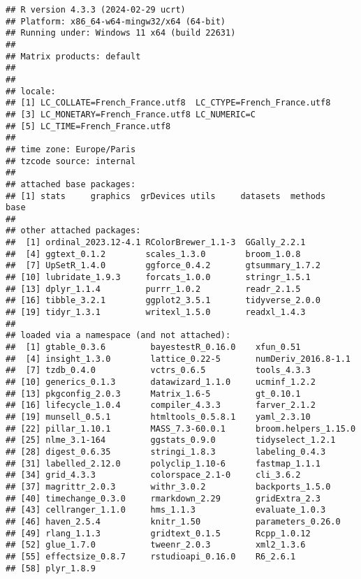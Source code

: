 \documentclass[
]{article}
\begin{document}
\begin{verbatim}
## R version 4.3.3 (2024-02-29 ucrt)
## Platform: x86_64-w64-mingw32/x64 (64-bit)
## Running under: Windows 11 x64 (build 22631)
## 
## Matrix products: default
## 
## 
## locale:
## [1] LC_COLLATE=French_France.utf8  LC_CTYPE=French_France.utf8   
## [3] LC_MONETARY=French_France.utf8 LC_NUMERIC=C                  
## [5] LC_TIME=French_France.utf8    
## 
## time zone: Europe/Paris
## tzcode source: internal
## 
## attached base packages:
## [1] stats     graphics  grDevices utils     datasets  methods   base     
## 
## other attached packages:
##  [1] ordinal_2023.12-4.1 RColorBrewer_1.1-3  GGally_2.2.1       
##  [4] ggtext_0.1.2        scales_1.3.0        broom_1.0.8        
##  [7] UpSetR_1.4.0        ggforce_0.4.2       gtsummary_1.7.2    
## [10] lubridate_1.9.3     forcats_1.0.0       stringr_1.5.1      
## [13] dplyr_1.1.4         purrr_1.0.2         readr_2.1.5        
## [16] tibble_3.2.1        ggplot2_3.5.1       tidyverse_2.0.0    
## [19] tidyr_1.3.1         writexl_1.5.0       readxl_1.4.3       
## 
## loaded via a namespace (and not attached):
##  [1] gtable_0.3.6         bayestestR_0.16.0    xfun_0.51           
##  [4] insight_1.3.0        lattice_0.22-5       numDeriv_2016.8-1.1 
##  [7] tzdb_0.4.0           vctrs_0.6.5          tools_4.3.3         
## [10] generics_0.1.3       datawizard_1.1.0     ucminf_1.2.2        
## [13] pkgconfig_2.0.3      Matrix_1.6-5         gt_0.10.1           
## [16] lifecycle_1.0.4      compiler_4.3.3       farver_2.1.2        
## [19] munsell_0.5.1        htmltools_0.5.8.1    yaml_2.3.10         
## [22] pillar_1.10.1        MASS_7.3-60.0.1      broom.helpers_1.15.0
## [25] nlme_3.1-164         ggstats_0.9.0        tidyselect_1.2.1    
## [28] digest_0.6.35        stringi_1.8.3        labeling_0.4.3      
## [31] labelled_2.12.0      polyclip_1.10-6      fastmap_1.1.1       
## [34] grid_4.3.3           colorspace_2.1-0     cli_3.6.2           
## [37] magrittr_2.0.3       withr_3.0.2          backports_1.5.0     
## [40] timechange_0.3.0     rmarkdown_2.29       gridExtra_2.3       
## [43] cellranger_1.1.0     hms_1.1.3            evaluate_1.0.3      
## [46] haven_2.5.4          knitr_1.50           parameters_0.26.0   
## [49] rlang_1.1.3          gridtext_0.1.5       Rcpp_1.0.12         
## [52] glue_1.7.0           tweenr_2.0.3         xml2_1.3.6          
## [55] effectsize_0.8.7     rstudioapi_0.16.0    R6_2.6.1            
## [58] plyr_1.8.9
\end{verbatim}
\end{document}
